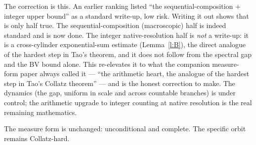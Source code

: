 \documentclass[11pt]{article}
\theoremstyle{remark}\newtheorem{remark}{Remark}
\begin{document}
The correction is this. An earlier ranking listed ``the sequential-composition
$+$ integer upper bound'' as a standard write-up, low risk. Writing it out shows
that is only half true. The sequential-composition (macroscopic) half is indeed
standard and is now done. The integer native-resolution half is \emph{not} a
write-up: it is a cross-cylinder exponential-sum estimate (Lemma~\ref{l:B}),
the direct analogue of the hardest step in Tao's theorem, and it does not follow
from the spectral gap and the BV bound alone. This re-elevates it to what the
companion measure-form paper always called it --- ``the arithmetic heart, the
analogue of the hardest step in Tao's Collatz theorem'' --- and is the honest
correction to make. The dynamics (the gap, uniform in scale and across
countable branches) is under control; the arithmetic upgrade to integer
counting at native resolution is the real remaining mathematics.

The measure form is unchanged: unconditional and complete. The specific orbit
remains Collatz-hard.
\end{document}
